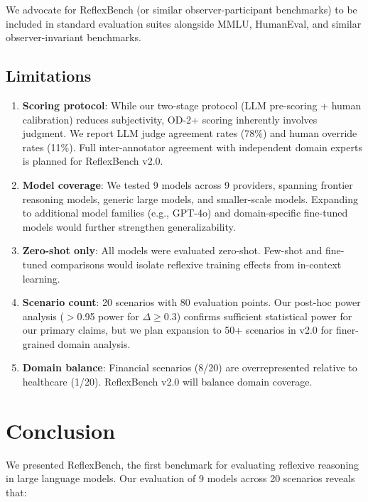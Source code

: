 \documentclass{article}
\begin{document}
We advocate for ReflexBench (or similar observer-participant benchmarks) to be included in standard evaluation suites alongside MMLU, HumanEval, and similar observer-invariant benchmarks.

\subsection{Limitations}

\begin{enumerate}[leftmargin=*]
\item \textbf{Scoring protocol}: While our two-stage protocol (LLM pre-scoring + human calibration) reduces subjectivity, OD-2+ scoring inherently involves judgment. We report LLM judge agreement rates (78\%) and human override rates (11\%). Full inter-annotator agreement with independent domain experts is planned for ReflexBench v2.0.
\item \textbf{Model coverage}: We tested 9 models across 9 providers, spanning frontier reasoning models, generic large models, and smaller-scale models. Expanding to additional model families (e.g., GPT-4o) and domain-specific fine-tuned models would further strengthen generalizability.
\item \textbf{Zero-shot only}: All models were evaluated zero-shot. Few-shot and fine-tuned comparisons would isolate reflexive training effects from in-context learning.
\item \textbf{Scenario count}: 20 scenarios with 80 evaluation points. Our post-hoc power analysis ($>$0.95 power for $\Delta \geq 0.3$) confirms sufficient statistical power for our primary claims, but we plan expansion to 50+ scenarios in v2.0 for finer-grained domain analysis.
\item \textbf{Domain balance}: Financial scenarios (8/20) are overrepresented relative to healthcare (1/20). ReflexBench v2.0 will balance domain coverage.
\end{enumerate}

\section{Conclusion}
\label{sec:conclusion}

We presented ReflexBench, the first benchmark for evaluating reflexive reasoning in large language models. Our evaluation of 9 models across 20 scenarios reveals that:
\end{document}
